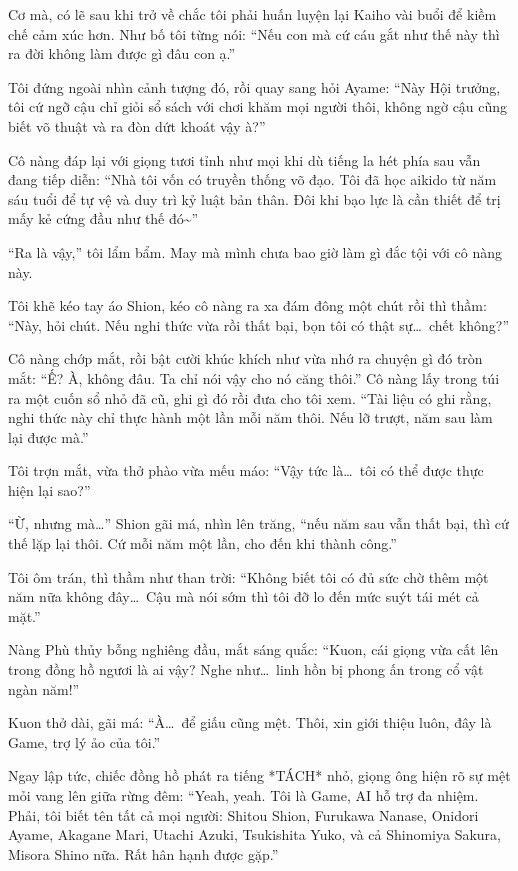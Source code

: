 \documentclass[../main.tex]{subfiles}
\begin{document}
Cơ mà, có lẽ sau khi trở về chắc tôi phải huấn luyện lại Kaiho vài buổi để kiềm chế cảm xúc hơn. Như bố tôi từng nói: ``Nếu con mà cứ cáu gắt như thế này thì ra đời không làm được gì đâu con ạ.''

Tôi đứng ngoài nhìn cảnh tượng đó, rồi quay sang hỏi Ayame: ``Này Hội trưởng, tôi cứ ngỡ cậu chỉ giỏi sổ sách với chơi khăm mọi người thôi, không ngờ cậu cũng biết võ thuật và ra đòn dứt khoát vậy à?''

Cô nàng đáp lại với giọng tươi tỉnh như mọi khi dù tiếng la hét phía sau vẫn đang tiếp diễn: ``Nhà tôi vốn có truyền thống võ đạo. Tôi đã học aikido từ năm sáu tuổi để tự vệ và duy trì kỷ luật bản thân. Đôi khi bạo lực là cần thiết để trị mấy kẻ cứng đầu như thế đó\~{}''

``Ra là vậy,'' tôi lẩm bẩm. May mà mình chưa bao giờ làm gì đắc tội với cô nàng này.

Tôi khẽ kéo tay áo Shion, kéo cô nàng ra xa đám đông một chút rồi thì thầm: ``Này, hỏi chút. Nếu nghi thức vừa rồi thất bại, bọn tôi có thật sự\dots\ chết không?''

Cô nàng chớp mắt, rồi bật cười khúc khích như vừa nhớ ra chuyện gì đó tròn mắt: ``Ế? À, không đâu. Ta chỉ nói vậy cho nó căng thôi.'' Cô nàng lấy trong túi ra một cuốn sổ nhỏ đã cũ, ghi gì đó rồi đưa cho tôi xem. ``Tài liệu có ghi rằng, nghi thức này chỉ thực hành một lần mỗi năm thôi. Nếu lỡ trượt, năm sau làm lại được mà.''

Tôi trợn mắt, vừa thở phào vừa mếu máo: ``Vậy tức là\dots\ tôi có thể được thực hiện lại sao?''

``Ừ, nhưng mà\dots'' Shion gãi má, nhìn lên trăng, ``nếu năm sau vẫn thất bại, thì cứ thế lặp lại thôi. Cứ mỗi năm một lần, cho đến khi thành công.''

Tôi ôm trán, thì thầm như than trời: ``Không biết tôi có đủ sức chờ thêm một năm nữa không đây\dots\ Cậu mà nói sớm thì tôi đỡ lo đến mức suýt tái mét cả mặt.''

Nàng Phù thủy bỗng nghiêng đầu, mắt sáng quắc: ``Kuon, cái giọng vừa cất lên trong đồng hồ ngươi là ai vậy? Nghe như\dots\ linh hồn bị phong ấn trong cổ vật ngàn năm!''

Kuon thở dài, gãi má: ``À\dots\ để giấu cũng mệt. Thôi, xin giới thiệu luôn, đây là Game, trợ lý ảo của tôi.''

Ngay lập tức, chiếc đồng hồ phát ra tiếng *TÁCH* nhỏ, giọng ông hiện rõ sự mệt mỏi vang lên giữa rừng đêm: ``Yeah, yeah. Tôi là Game, AI hỗ trợ đa nhiệm. Phải, tôi biết tên tất cả mọi người: Shitou Shion, Furukawa Nanase, Onidori Ayame, Akagane Mari, Utachi Azuki, Tsukishita Yuko, và cả Shinomiya Sakura, Misora Shino nữa. Rất hân hạnh được gặp.''
\end{document}
